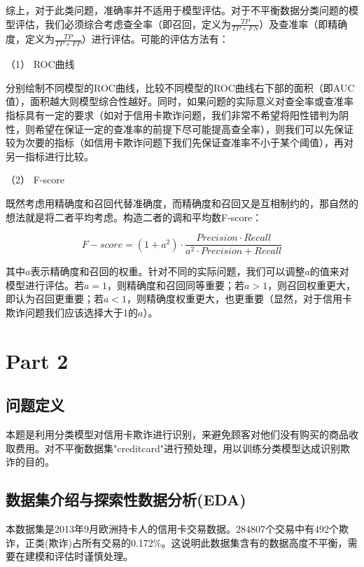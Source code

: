 \documentclass[a4paper,12pt]{article}
\begin{document}
	综上，对于此类问题，准确率并不适用于模型评估。对于不平衡数据分类问题的模型评估，我们必须综合考虑查全率（即召回，定义为$\frac{TP}{TP+FN}$）及查准率（即精确度，定义为$\frac{TP}{TP+FP}$）进行评估。可能的评估方法有：
	
	（1）	ROC曲线
	
	分别绘制不同模型的ROC曲线，比较不同模型的ROC曲线右下部的面积（即AUC值），面积越大则模型综合性越好。同时，如果问题的实际意义对查全率或查准率指标具有一定的要求（如对于信用卡欺诈问题，我们非常不希望将阳性错判为阴性，则希望在保证一定的查准率的前提下尽可能提高查全率），则我们可以先保证较为次要的指标（如信用卡欺诈问题下我们先保证查准率不小于某个阈值），再对另一指标进行比较。
	
	（2）	F-score
	
	既然考虑用精确度和召回代替准确度，而精确度和召回又是互相制约的，那自然的想法就是将二者平均考虑。构造二者的调和平均数F-score：
	
	$$
	F-score=(1+a^2) \cdot \frac{Precision \cdot Recall}{a^2 \cdot Precision + Recall}
	$$
	
	其中$a$表示精确度和召回的权重。针对不同的实际问题，我们可以调整$a$的值来对模型进行评估。若$a=1$，则精确度和召回同等重要；若$a>1$，则召回权重更大，即认为召回更重要；若$a<1$，则精确度权重更大，也更重要（显然，对于信用卡欺诈问题我们应该选择大于1的$a$）。
	
	
	
	\section{Part 2}
	\subsection{问题定义}
	 本题是利用分类模型对信用卡欺诈进行识别，来避免顾客对他们没有购买的商品收取费用。对不平衡数据集"creditcard"进行预处理，用以训练分类模型达成识别欺诈的目的。
	\subsection{数据集介绍与探索性数据分析(EDA)}
	本数据集是2013年9月欧洲持卡人的信用卡交易数据。284807个交易中有492个欺诈，正类(欺诈)占所有交易的0.172\%。这说明此数据集含有的数据高度不平衡，需要在建模和评估时谨慎处理。
	
\end{document}
